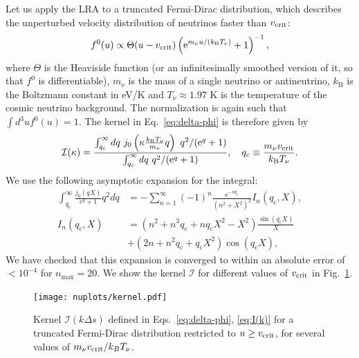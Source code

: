 \documentclass[useAMS, usenatbib]{mnras}
\newcommand{\barr}{\begin{eqnarray}}
\newcommand{\earr}{\end{eqnarray}}
\newcommand{\rme}{\textrm{e}}
\begin{document}
Let us apply the LRA to a truncated Fermi-Dirac distribution, which describes the unperturbed velocity distribution of neutrinos faster than $v_{\rm crit}$:
\begin{equation}
f^0(u) \propto \Theta(u - v_{\rm crit}) \left(\rme^{m_\nu u/ \left(k_\mathrm{B} T_\nu\right)} + 1 \right)^{-1},
\end{equation}
where $\Theta$ is the Heaviside function (or an infinitesimally smoothed version of it, so that $f^0$ is differentiable), $m_\nu$ is the mass of a single neutrino or antineutrino, $k_\mathrm{B}$ is the Boltzmann constant in eV/K and $T_\nu \approx 1.97$ K is the temperature of the cosmic neutrino background. The normalization is again such that $\int d^3 u f^0(u) = 1$. The kernel in Eq.~\eqref{eq:delta-phi} is therefore given by
\barr
\mathcal{I}(\kappa) = \frac{\int_{q_c}^{\infty} dq~ j_0\left(\kappa \frac{k_\mathrm{B} T_\nu}{m_\nu}q\right)~ q^2 /(\rme^q + 1) }{\int_{q_c}^{\infty} dq ~q^2/(\rme^q + 1)}, \ \ \ q_c \equiv \frac{m_\nu v_{\rm crit}}{k_\mathrm{B} T_\nu}.
\earr
We use the following asymptotic expansion for the integral:
\begin{align}
 \int^\infty_{q_\mathrm{c}} \frac{j_0(qX)}{e^q + 1} q^2 dq &= - \sum^{\infty}_{n=1} (-1)^n \frac{\rme^{-n q_\mathrm{c}}}{(n^2+X^2)^2} I_n(q_\mathrm{c},X),\\
 I_n(q_\mathrm{c},X) &= \left(n^2 + n^3 q_\mathrm{c} + n q_\mathrm{c} X^2 - X^2\right) \frac{\sin(q_\mathrm{c} X)}{X} \nonumber \\
 &+ \left(2n + n^2 q_\mathrm{c} + q_\mathrm{c} X^2\right) \cos(q_\mathrm{c} X),
\end{align}
We have checked that this expansion is converged to within an absolute error of $< 10^{-4}$ for $n_\mathrm{max} = 20$. We show the kernel $\mathcal{I}$ for different values of $v_{\rm crit}$ in Fig.~\ref{fig:kernel}.

\begin{figure}
\texttt{[image: nuplots/kernel.pdf]}
\caption{Kernel $\mathcal{I}(k \Delta s)$ defined in Eqs.~\eqref{eq:delta-phi}, \eqref{eq:I(k)} for a truncated Fermi-Dirac distribution restricted to $u \geq v_{\rm crit}$, for several values of $m_\nu v_{\rm crit}/k_B T_\nu$. }
\label{fig:kernel}
\end{figure}
\end{document}

